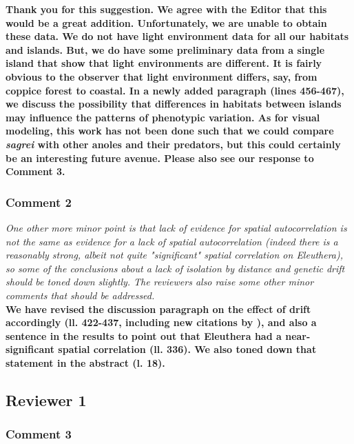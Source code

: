 \documentclass{article}
\begin{document}
	\textbf{Thank you for this suggestion. We agree with the Editor that this would be a great addition. Unfortunately, we are unable to obtain these data. We do not have light environment data for all our habitats and islands. But, we do have some preliminary data from a single island that show that light environments are different. It is fairly obvious to the observer that light environment differs, say, from coppice forest to coastal. In a newly added paragraph (lines 456-467), we discuss the possibility that differences in habitats between islands may influence the patterns of phenotypic variation.
	As for visual modeling, this work has not been done such that we could compare \textit{sagrei} with other anoles and their predators, but this could certainly be an interesting future avenue. Please also see our response to Comment 3.}

	\subsubsection*{Comment 2}
	
	\textit{One other more minor point is that lack of evidence for spatial autocorrelation is not the same as evidence for a lack of spatial autocorrelation (indeed there is a reasonably strong, albeit not quite "significant" spatial correlation on Eleuthera), so some of the conclusions about a lack of isolation by distance and genetic drift should be toned down slightly. The reviewers also raise some other minor comments that should be addressed.}\\
	
	\textbf{We have revised the discussion paragraph on the effect of drift accordingly (ll. 422-437, including new citations by \citealt{Wright1943, Kimura1964, Slatkin1987}), and also a sentence in the results to point out that Eleuthera had a near-significant spatial correlation (ll. 336). We also toned down that statement in the abstract (l. 18).}
	
	\pagebreak
	
	\subsection*{Reviewer 1}
	
	\subsubsection*{Comment 3}
	
\end{document}
